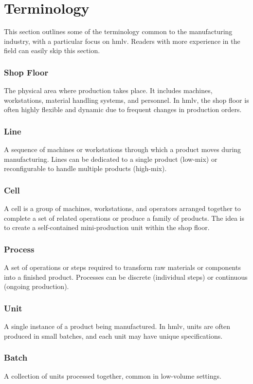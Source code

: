 \section{Terminology}
This section outlines some of the terminology common to the manufacturing industry, with a particular focus on \ac{hmlv}. 
Readers with more experience in the field can easily skip this section.

\subsubsection{Shop Floor}
The physical area where production takes place.
It includes machines, workstations, material handling systems, and personnel.
In \ac{hmlv}, the shop floor is often highly flexible and dynamic due to frequent changes in production orders.

\subsubsection{Line}
A sequence of machines or workstations through which a product moves during manufacturing.
Lines can be dedicated to a single product (low-mix) or reconfigurable to handle multiple products (high-mix).

\subsubsection{Cell}
A cell is a group of machines, workstations, and operators arranged together to complete a set of related operations or produce a family of products.
The idea is to create a self-contained mini-production unit within the shop floor.

\subsubsection{Process}
A set of operations or steps required to transform raw materials or components into a finished product.
Processes can be discrete (individual steps) or continuous (ongoing production).

\subsubsection{Unit}
A single instance of a product being manufactured.
In \ac{hmlv}, units are often produced in small batches, and each unit may have unique specifications.

\subsubsection{Batch}
A collection of units processed together, common in low-volume settings.

